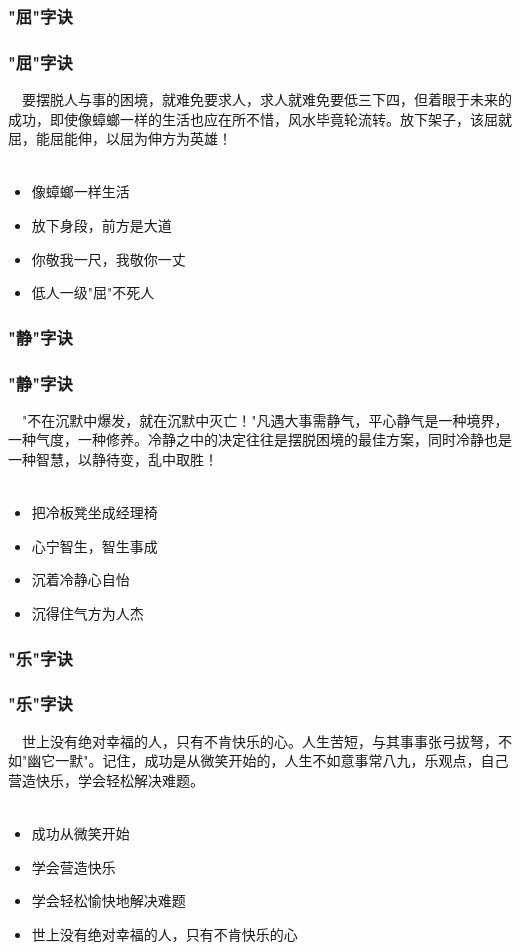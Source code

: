 \subsubsection{"屈"字诀}
\begin{frame}
\frametitle{"屈"字诀}
\noindent\handr~~要摆脱人与事的困境，就难免要求人，求人就难免要低三下四，但着眼于未来的成功，即使像蟑螂一样的生活也应在所不惜，风水毕竟轮流转。放下架子，该屈就屈，能屈能伸，以屈为伸方为英雄！
~\\
~\\
\begin{itemize}
    \item 像蟑螂一样生活
    \item 放下身段，前方是大道
    \item 你敬我一尺，我敬你一丈
    \item 低人一级"屈"不死人
\end{itemize}
\end{frame}

\subsubsection{"静"字诀}
\begin{frame}
\frametitle{"静"字诀}
\noindent\handr~~"不在沉默中爆发，就在沉默中灭亡！"凡遇大事需静气，平心静气是一种境界，一种气度，一种修养。冷静之中的决定往往是摆脱困境的最佳方案，同时冷静也是一种智慧，以静待变，乱中取胜！
~\\
~\\
\begin{itemize}
    \item 把冷板凳坐成经理椅
    \item 心宁智生，智生事成
    \item 沉着冷静心自怡
    \item 沉得住气方为人杰
\end{itemize}
\end{frame}

\subsubsection{"乐"字诀}
\begin{frame}
\frametitle{"乐"字诀}
\noindent\handr~~世上没有绝对幸福的人，只有不肯快乐的心。人生苦短，与其事事张弓拔弩，不如"幽它一默"。记住，成功是从微笑开始的，人生不如意事常八九，乐观点，自己营造快乐，学会轻松解决难题。
~\\
~\\
\begin{itemize}
    \item 成功从微笑开始
    \item 学会营造快乐
    \item 学会轻松愉快地解决难题
    \item 世上没有绝对幸福的人，只有不肯快乐的心
\end{itemize}
\end{frame}

